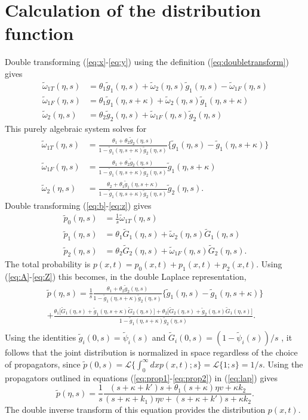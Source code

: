 \documentclass[]{agujournal2018}
\newcommand\be{\begin{equation}}
\newcommand\ee{\end{equation}}
\newcommand\tom{\tilde{\omega}}
\newcommand\tg{\tilde{g}}
\newcommand\tp{\tilde{p}}
\newcommand\tG{\tilde{G}}
\begin{document}
\appendix

\section{Calculation of the distribution function}
\label{sec:appendixA}
Double transforming (\ref{eq:x}-\ref{eq:y}) using the definition (\ref{eq:doubletransform}) gives
\begin{align}
\tom_{1T}(\eta,s) &= \theta_1 \tg_1(\eta,s) + \tom_2(\eta,s)\tg_1(\eta,s)-\tom_{1F}(\eta,s)\\
\tom_{1F}(\eta,s) &= \theta_1\tg_1(\eta,s+\kappa) + \tom_2(\eta,s)\tg_1(\eta,s+\kappa)\\
\tom_2(\eta,s) &= \theta_2 \tg_2(\eta,s) + \tom_{1F}(\eta,s)\tg_2(\eta,s)
\end{align}
This purely algebraic system solves for 
\begin{align}
\tom_{1T}(\eta,s) &= \frac{\theta_1 + \theta_2 \tg_2(\eta,s)}{1-\tg_1(\eta,s+\kappa)\tg_2(\eta,s)}\big\{\tg_1(\eta,s)-\tg_1(\eta,s+\kappa) \big\} \label{eq:A} \\
\tom_{1F}(\eta,s) &= \frac{\theta_1 + \theta_2 \tg_2(\eta,s)}{1-\tg_1(\eta,s+\kappa)\tg_2(\eta,s)}\tg_1(\eta,s+\kappa)\\
\tom_{2}(\eta,s) &= \frac{\theta_2 + \theta_1 \tg_1(\eta,s+\kappa)}{1-\tg_1(\eta,s+\kappa)\tg_2(\eta,s)}\tg_2(\eta,s). 
\end{align}
Double transforming (\ref{eq:b}-\ref{eq:z}) gives
\begin{align}
\tp_0(\eta,s) &= \frac{1}{s}\tom_{1T}(\eta,s)\\
\tp_1(\eta,s) &= \theta_1 \tG_1(\eta,s) + \tom_2(\eta,s) \tG_1(\eta,s) \\
\tp_2(\eta,s) &= \theta_2 \tG_2(\eta,s) + \tom_{1F}(\eta,s)\tG_2(\eta,s).\label{eq:Z}
\end{align}
The total probability is $p(x,t) = p_0(x,t) + p_1(x,t) + p_2(x,t)$. Using (\ref{eq:A}-\ref{eq:Z}) this becomes, in the double Laplace representation, 
\begin{multline}
\tp(\eta,s) = \frac{1}{s}\frac{\theta_1 + \theta_2 \tg_2(\eta,s)}{1-\tg_1(\eta,s+\kappa)\tg_2(\eta,s)}\big\{\tg_1(\eta,s)-\tg_1(\eta,s+\kappa) \big\} \\
+\frac{\theta_1\big[\tG_1(\eta,s) + \tg_1(\eta,s+\kappa)\tG_2(\eta,s)\big]+ \theta_2\big[\tG_2(\eta,s) + \tg_2(\eta,s)\tG_1(\eta,s)\big]}{1-\tg_1(\eta,s+\kappa)\tg_2(\eta,s)}. \\
\label{eq:lap}
\end{multline}
Using the identities $\tg_i(0,s) = \tilde{\psi}_i(s)$ and $\tG_i(0,s) = (1-\tilde{\psi}_i(s))/s$ \citep[e.g.][]{Weiss1994}, it follows that the joint distribution is normalized in space regardless of the choice of propagators, since $\tp(0,s) = \mathcal{L}\{\int_0^\infty dx p(x,t);s\} = \mathcal{L}\{1;s\} = 1/s$.
Using the propagators outlined in equations (\ref{eq:prop1}-\ref{eq:prop2}) in (\ref{eq:lap}) gives 
\be \tilde{p}(\eta,s) = \frac{1}{s}\frac{(s+\kappa + k')s  + \theta_1(s+\kappa )\eta v+ \kappa k_2}{(s+\kappa+k_1)\eta v+(s+\kappa+k')s + \kappa k_2}.\label{eq:nicedist}\ee
The double inverse transform of this equation provides the distribution $p(x,t)$.
\end{document}
